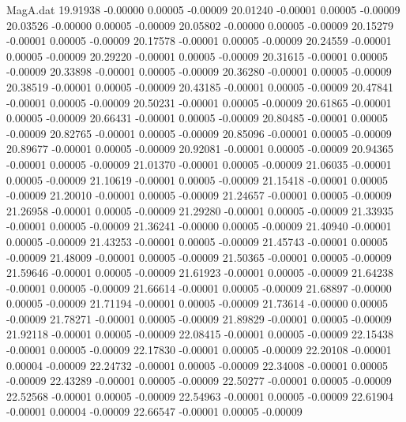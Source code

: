 \begin{filecontents}{MagA.dat}
  19.91938   -0.00000    0.00005   -0.00009
  20.01240   -0.00001    0.00005   -0.00009
  20.03526   -0.00000    0.00005   -0.00009
  20.05802   -0.00000    0.00005   -0.00009
  20.15279   -0.00001    0.00005   -0.00009
  20.17578   -0.00001    0.00005   -0.00009
  20.24559   -0.00001    0.00005   -0.00009
  20.29220   -0.00001    0.00005   -0.00009
  20.31615   -0.00001    0.00005   -0.00009
  20.33898   -0.00001    0.00005   -0.00009
  20.36280   -0.00001    0.00005   -0.00009
  20.38519   -0.00001    0.00005   -0.00009
  20.43185   -0.00001    0.00005   -0.00009
  20.47841   -0.00001    0.00005   -0.00009
  20.50231   -0.00001    0.00005   -0.00009
  20.61865   -0.00001    0.00005   -0.00009
  20.66431   -0.00001    0.00005   -0.00009
  20.80485   -0.00001    0.00005   -0.00009
  20.82765   -0.00001    0.00005   -0.00009
  20.85096   -0.00001    0.00005   -0.00009
  20.89677   -0.00001    0.00005   -0.00009
  20.92081   -0.00001    0.00005   -0.00009
  20.94365   -0.00001    0.00005   -0.00009
  21.01370   -0.00001    0.00005   -0.00009
  21.06035   -0.00001    0.00005   -0.00009
  21.10619   -0.00001    0.00005   -0.00009
  21.15418   -0.00001    0.00005   -0.00009
  21.20010   -0.00001    0.00005   -0.00009
  21.24657   -0.00001    0.00005   -0.00009
  21.26958   -0.00001    0.00005   -0.00009
  21.29280   -0.00001    0.00005   -0.00009
  21.33935   -0.00001    0.00005   -0.00009
  21.36241   -0.00000    0.00005   -0.00009
  21.40940   -0.00001    0.00005   -0.00009
  21.43253   -0.00001    0.00005   -0.00009
  21.45743   -0.00001    0.00005   -0.00009
  21.48009   -0.00001    0.00005   -0.00009
  21.50365   -0.00001    0.00005   -0.00009
  21.59646   -0.00001    0.00005   -0.00009
  21.61923   -0.00001    0.00005   -0.00009
  21.64238   -0.00001    0.00005   -0.00009
  21.66614   -0.00001    0.00005   -0.00009
  21.68897   -0.00000    0.00005   -0.00009
  21.71194   -0.00001    0.00005   -0.00009
  21.73614   -0.00000    0.00005   -0.00009
  21.78271   -0.00001    0.00005   -0.00009
  21.89829   -0.00001    0.00005   -0.00009
  21.92118   -0.00001    0.00005   -0.00009
  22.08415   -0.00001    0.00005   -0.00009
  22.15438   -0.00001    0.00005   -0.00009
  22.17830   -0.00001    0.00005   -0.00009
  22.20108   -0.00001    0.00004   -0.00009
  22.24732   -0.00001    0.00005   -0.00009
  22.34008   -0.00001    0.00005   -0.00009
  22.43289   -0.00001    0.00005   -0.00009
  22.50277   -0.00001    0.00005   -0.00009
  22.52568   -0.00001    0.00005   -0.00009
  22.54963   -0.00001    0.00005   -0.00009
  22.61904   -0.00001    0.00004   -0.00009
  22.66547   -0.00001    0.00005   -0.00009

\end{filecontents}
